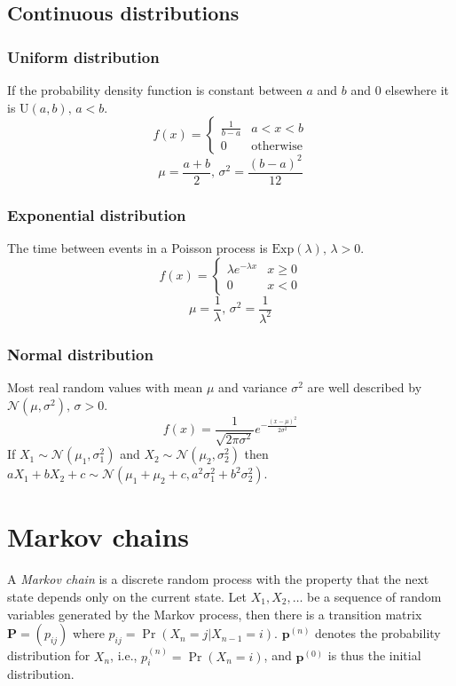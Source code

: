 \subsection{Continuous distributions}

\subsubsection{Uniform distribution}
If the probability density function is constant between $a$ and $b$ and 0 elsewhere it is $\textrm{U}(a,b),\,a<b$.
$$f(x) = \left\{
\begin{array}{cl}
\frac{1}{b-a} & a<x<b\\
0 & \textrm{otherwise}
\end{array}\right.$$
$$\mu=\frac{a+b}{2},\,\sigma^2=\frac{(b-a)^2}{12}$$

\subsubsection{Exponential distribution}
The time between events in a Poisson process is $\textrm{Exp}(\lambda),\,\lambda>0$.
$$f(x) = \left\{
\begin{array}{cl}
\lambda e^{-\lambda x} & x\geq0\\
0 & x<0
\end{array}\right.$$
$$\mu=\frac{1}{\lambda},\,\sigma^2=\frac{1}{\lambda^2}$$

\subsubsection{Normal distribution}
Most real random values with mean $\mu$ and variance $\sigma^2$ are well described by $\mathcal{N}(\mu,\sigma^2),\,\sigma>0$.
$$f(x) = \frac{1}{\sqrt{2\pi\sigma^2}}e^{-\frac{(x-\mu)^2}{2\sigma^2}}$$
If $X_1 \sim \mathcal{N}(\mu_1,\sigma_1^2)$ and $X_2 \sim \mathcal{N}(\mu_2,\sigma_2^2)$ then  $aX_1 + bX_2 + c \sim \mathcal{N}(\mu_1+\mu_2+c,a^2\sigma_1^2+b^2\sigma_2^2)$.

\section{Markov chains}
A \emph{Markov chain} is a discrete random process with the property that the next state depends only on the current state. Let $X_1,X_2,\ldots$ be a sequence of random variables generated by the Markov process, then there is a transition matrix $\mathbf{P} = (p_{ij})$ where $p_{ij} = \Pr(X_n = j | X_{n-1} = i)$. $\mathbf{p}^{(n)}$ denotes the probability distribution for $X_n$, i.e., $p^{(n)}_i = \Pr(X_n = i)$, and $\mathbf{p}^{(0)}$ is thus the initial distribution.

